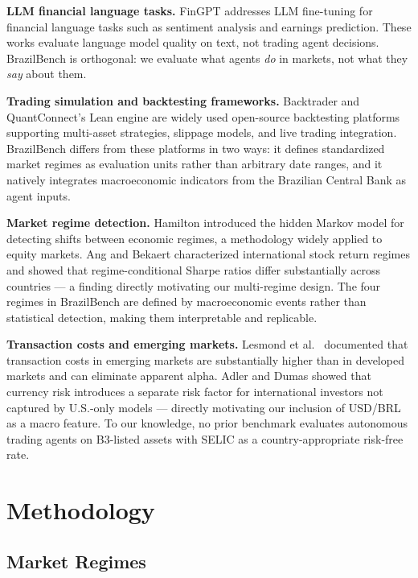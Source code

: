 \documentclass{article}
\begin{document}
\textbf{LLM financial language tasks.}
FinGPT \cite{fingpt2023} addresses LLM fine-tuning for financial
language tasks such as sentiment analysis and earnings prediction.
These works evaluate language model quality on text, not trading agent
decisions. BrazilBench is orthogonal: we evaluate what agents
\textit{do} in markets, not what they \textit{say} about them.

\textbf{Trading simulation and backtesting frameworks.}
Backtrader \cite{backtrader2015} and QuantConnect's Lean engine
\cite{quantconnect2013} are widely used open-source backtesting
platforms supporting multi-asset strategies, slippage models, and live
trading integration. BrazilBench differs from these platforms in two
ways: it defines standardized market regimes as evaluation units rather
than arbitrary date ranges, and it natively integrates macroeconomic
indicators from the Brazilian Central Bank \cite{bacen} as agent inputs.

\textbf{Market regime detection.}
Hamilton \cite{hamilton1989} introduced the hidden Markov model for
detecting shifts between economic regimes, a methodology widely applied
to equity markets. Ang and Bekaert \cite{angbekaert2002} characterized
international stock return regimes and showed that regime-conditional
Sharpe ratios differ substantially across countries --- a finding
directly motivating our multi-regime design. The four regimes in
BrazilBench are defined by macroeconomic events rather than statistical
detection, making them interpretable and replicable.

\textbf{Transaction costs and emerging markets.}
Lesmond et al.\ \cite{lesmond1999} documented that transaction costs in
emerging markets are substantially higher than in developed markets and
can eliminate apparent alpha. Adler and Dumas \cite{adlerdumas1983}
showed that currency risk introduces a separate risk factor for
international investors not captured by U.S.-only models --- directly
motivating our inclusion of USD/BRL as a macro feature. To our
knowledge, no prior benchmark evaluates autonomous trading agents on
B3-listed assets with SELIC as a country-appropriate risk-free rate.

\section{Methodology}

\subsection{Market Regimes}
\end{document}
